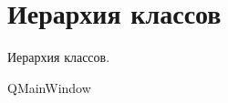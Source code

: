 \section{Иерархия классов}
Иерархия классов.\begin{DoxyCompactList}
\item {}
\item {}
\item {}
\item Q\+Main\+Window\begin{DoxyCompactList}
\item {}
\end{DoxyCompactList}
\end{DoxyCompactList}
